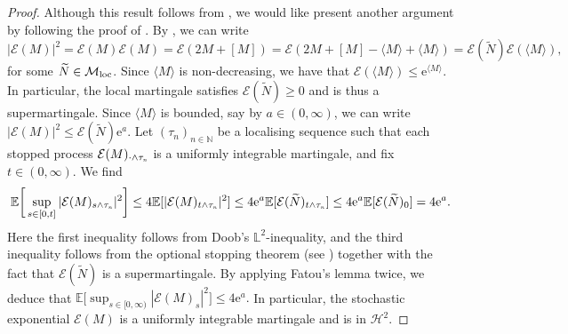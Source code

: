 \documentclass[10pt]{article} %
\newcommand\cE{\mathcal E}
\newcommand\cH{\mathcal H}
\newcommand\cM{\mathcal M}
\newcommand{\smalltext}[1]{\text{\fontsize{4}{4}\selectfont$#1$}}
\def \E{\mathbb{E}}
\def \L{\mathbb{L}}
\def \N{\mathbb{N}}
\begin{document}
\begin{proof}
	Although this result follows from \cite[Proposition 8.27]{jacod1979calcul}, we would like present another argument by following the proof of \cite[Th\'eor\`eme II.3]{lepingle1978sur}. By \cite[Proposition II.1]{lepingle1978sur2}, we can write
	\begin{equation*}
		|\cE(M)|^2 = \cE(M)\cE(M) = \cE(2M + [M]) = \cE(2M + [M] - \langle M \rangle + \langle M \rangle) = \cE(\widetilde N) \cE(\langle M \rangle),
	\end{equation*}
	for some $\widetilde N \in \cM_\text{\rm loc}$. Since $\langle M \rangle$ is non-decreasing, we have that $\cE(\langle M \rangle) \leq \mathrm{e}^{\langle M \rangle}$. In particular, the local martingale satisfies $\cE(\widetilde N) \geq 0$ and is thus a supermartingale. Since $\langle M \rangle$ is bounded, say by $a \in (0,\infty)$, we can write $|\cE(M)|^2 \leq \cE(\widetilde N) \mathrm{e}^a$. Let $(\tau_n)_{n \in \N}$ be a localising sequence such that each stopped process $\cE(M)_{\cdot \land \tau_\smalltext{n}}$ is a uniformly integrable martingale, and fix $t \in (0,\infty)$. We find
	\begin{equation*}
		\E\bigg[\sup_{s \in [0,t]} |\cE(M)_{s \land \tau_\smalltext{n}}|^2\bigg] \leq 4 \E[|\cE(M)_{t \land \tau_\smalltext{n}}|^2] \leq 4 \mathrm{e}^a \E[\cE(\widetilde N)_{t \land \tau_\smalltext{n}}] \leq 4 \mathrm{e}^a\E[\cE(\widetilde N)_0] = 4 \mathrm{e}^a.
	\end{equation*}
	Here the first inequality follows from Doob's $\L^2$-inequality, and the third inequality follows from the optional stopping theorem (see \cite[Theorem 3.2.7]{weizsaecker1990stochastic}) together with the fact that $\cE(\widetilde N)$ is a supermartingale. By applying Fatou's lemma twice, we deduce that $\E\big[\sup_{s \in [0,\infty)} |\cE(M)_s|^2\big] \leq 4 \mathrm{e}^a.$ In particular, the stochastic exponential $\cE(M)$ is a uniformly integrable martingale and is in $\cH^2$. 
	\end{proof}
\end{document}
